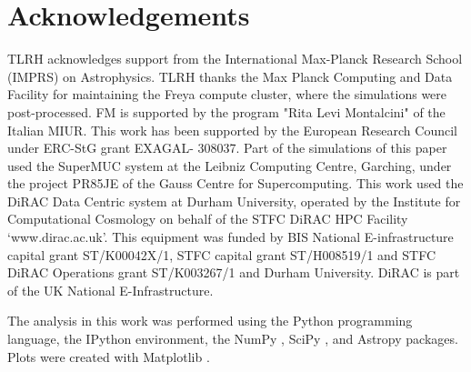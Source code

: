 \documentclass[a4paper,fleqn,usenatbib]{mnras}
\begin{document}
\section*{Acknowledgements}
TLRH acknowledges support from the International Max-Planck Research School (IMPRS)
on Astrophysics. TLRH thanks the Max Planck Computing and Data Facility for
maintaining the Freya compute cluster, where the simulations were post-processed.
FM is supported by the program "Rita Levi Montalcini" of the Italian MIUR.
This work has been supported by the European Research Council under ERC-StG grant
EXAGAL- 308037. Part of the simulations of this paper used the SuperMUC system 
at the Leibniz Computing Centre, Garching, under the project PR85JE of the Gauss 
Centre for Supercomputing. This work used the DiRAC Data Centric system at Durham
University, operated by the Institute for Computational Cosmology on behalf of
the STFC DiRAC HPC Facility `www.dirac.ac.uk'. This equipment was funded by BIS 
National E-infrastructure capital grant ST/K00042X/1, STFC capital grant 
ST/H008519/1 and STFC DiRAC Operations grant ST/K003267/1 and Durham University.
DiRAC is part of the UK National E-Infrastructure.


The analysis in this work was performed using the Python \citep{python}
programming language, the IPython \citep{2007CSE.....9c..21P} environment, 
the NumPy \citep{2011CSE....13b..22V}, SciPy \citep{scipy}, and Astropy 
\citep{2013A&A...558A..33A} packages. Plots were created with
Matplotlib \citep{2007CSE.....9...90H}.







 



\end{document}
